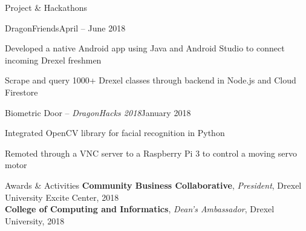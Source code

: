\documentclass{resume} %
\begin{document}
\begin{rSection}{Project \& Hackathons}

\begin{rSubsection}{DragonFriends}{April -- June 2018}{}{}
\item Developed a native Android app using Java and Android Studio to connect incoming Drexel freshmen
\item Scrape and query 1000+ Drexel classes through backend in Node.js and Cloud Firestore 
\end{rSubsection}


\begin{rSubsection}{Biometric Door -- \textit{DragonHacks 2018}}{January 2018}{}{}
\item Integrated OpenCV library for facial recognition in Python
\item Remoted through a VNC server to a Raspberry Pi 3 to control a moving servo motor 
\end{rSubsection}

\end{rSection}




\begin{rSection}{Awards \& Activities}
\textbf{Community Business Collaborative}, \textit{President}, Drexel University Excite Center, 2018 \\
\textbf{College of Computing and Informatics}, \textit{Dean's Ambassador}, Drexel University, 2018 \\
\end{rSection}
\end{document}
